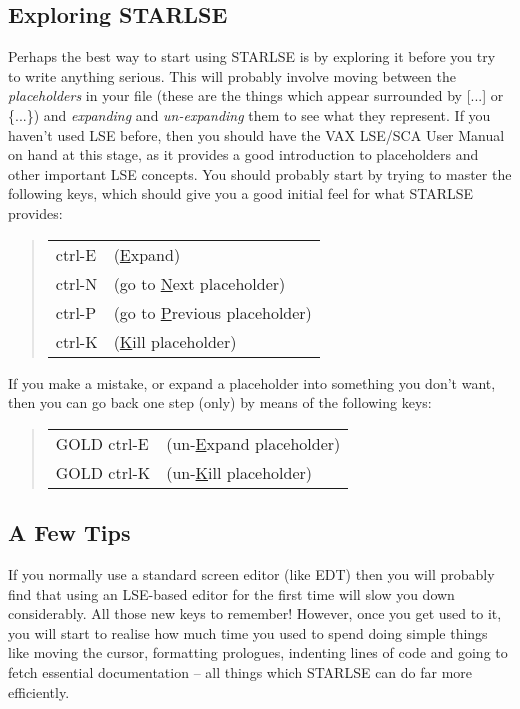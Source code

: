 \subsection{Exploring STARLSE}

Perhaps the best way to start using \mbox{STARLSE} is by exploring it
before you try to write anything serious. 
This will probably involve moving between the {\em placeholders} in your
file (these are the things which appear surrounded by [...] or \{...\}) and
{\em expanding} and {\em un-expanding} them to see what they represent. 
If you haven't used \mbox{LSE} before, then you should have the \mbox{VAX}
\mbox{LSE/SCA} User Manual on hand at this stage, as it provides a good
introduction to placeholders and other important \mbox{LSE} concepts. 
You should probably start by trying to master the following keys, which
should give you a good initial feel for what \mbox{STARLSE} provides: 

\begin{quote}
\begin{center}
\begin{tabular}{ll}
ctrl-E & (\underline{E}xpand)\\
ctrl-N & (go to \underline{N}ext placeholder)\\
ctrl-P & (go to \underline{P}revious placeholder)\\
ctrl-K & (\underline{K}ill placeholder)
\end{tabular}
\end{center}
\end{quote}

If you make a mistake, or expand a placeholder into something you don't 
want, then you can go back one step (only) by means of the following keys:

\begin{quote}
\begin{center}
\begin{tabular}{ll}
GOLD ctrl-E & (un-\underline{E}xpand placeholder)\\
GOLD ctrl-K & (un-\underline{K}ill placeholder)
\end{tabular}
\end{center}
\end{quote}


\subsection{A Few Tips}

If you normally use a standard screen editor (like EDT) then you will
probably find that using an \mbox{LSE}-based editor for the first time will
slow you down considerably. 
All those new keys to remember!
However, once you get used to it, you will start to realise how much time
you used to spend doing simple things like moving the cursor, formatting
prologues, indenting lines of code and going to fetch essential
documentation -- all things which \mbox{STARLSE} can do far more
efficiently. 

